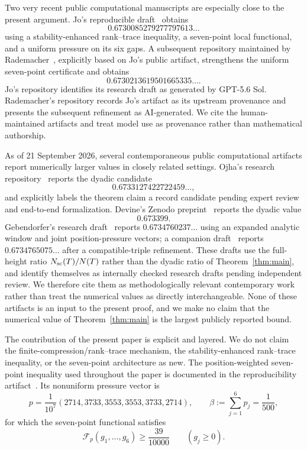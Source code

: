 \documentclass[11pt]{article}
\begin{document}
Two very recent public computational manuscripts are especially close to the
present argument. Jo's reproducible draft~\cite{Jo26} obtains
\[
 0.6730085279277797613\ldots
\]
using a stability-enhanced rank--trace inequality, a seven-point local
functional, and a uniform pressure on its six gaps. A subsequent repository
maintained by Rademacher~\cite{Rademacher26}, explicitly based on Jo's public
artifact, strengthens the uniform seven-point certificate and obtains
\[
 0.6730213619501665335\ldots .
\]
Jo's repository identifies its research draft as generated by GPT-5.6 Sol.
Rademacher's repository records Jo's artifact as its upstream provenance and
presents the subsequent refinement as AI-generated.  We cite the
human-maintained artifacts and treat model use as provenance rather than
mathematical authorship.

As of 21 September 2026, several contemporaneous public computational
artifacts report numerically larger values in closely related settings.
Ojha's research repository~\cite{Ojha26} reports the dyadic candidate
\[
 0.6733127422722459\ldots,
\]
and explicitly labels the theorem claim a record candidate pending expert
review and end-to-end formalization.  Devine's Zenodo preprint~\cite{Devine26}
reports the dyadic value
\[
 0.673399.
\]
Gebendorfer's research draft~\cite{Gebendorfer26} reports
$0.6734760237\ldots$ using an expanded analytic window and joint
position-pressure vectors; a companion draft~\cite{GebendorferCompat26}
reports $0.6734765075\ldots$ after a compatible-triple refinement.  These
drafts use the full-height ratio $N_{\rm sc}(T)/N(T)$ rather than the dyadic
ratio of Theorem~\ref{thm:main}, and identify themselves as internally
checked research drafts pending independent review.  We therefore cite them
as methodologically relevant contemporary work rather than treat the numerical
values as directly interchangeable.  None of these artifacts is an input to
the present proof, and we make no claim that the numerical value of
Theorem~\ref{thm:main} is the largest publicly reported bound.

The contribution of the present paper is explicit and layered.  We do not
claim the finite-compression/rank--trace mechanism, the stability-enhanced
rank--trace inequality, or the seven-point architecture as new.  The
position-weighted seven-point inequality used throughout the paper is
documented in the reproducibility artifact~\cite{Hurtado26Artifact}.  Its
nonuniform pressure vector is
\begin{equation}\label{eq:p}
 p=\frac1{10^7}(2714,3733,3553,3553,3733,2714),
 \qquad
 \beta:=\sum_{j=1}^6p_j=\frac1{500},
\end{equation}
for which the seven-point functional satisfies
\begin{equation}\label{eq:local-cert-intro}
 \mathcal F_p(g_1,\ldots,g_6)\ge\frac{39}{10000}
 \qquad(g_j\ge0).
\end{equation}
\end{document}

